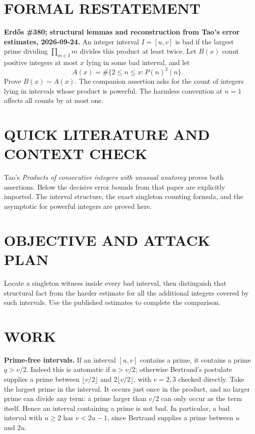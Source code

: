 \section{FORMAL RESTATEMENT}
\textbf{Erd\H{o}s \#380; structural lemmas and reconstruction from Tao's error estimates, 2026-09-24.}
An integer interval $I=[u,v]$ is bad if the largest prime dividing $\prod_{m\in I}m$ divides this product at least twice. Let $B(x)$ count positive integers at most $x$ lying in some bad interval, and let
\[
A(x)=\#\{2\leq n\leq x:P(n)^2\mid n\}.
\]
Prove $B(x)\sim A(x)$. The companion assertion asks for the count of integers lying in intervals whose product is powerful. The harmless convention at $n=1$ affects all counts by at most one.

\section{QUICK LITERATURE AND CONTEXT CHECK}
Tao's \emph{Products of consecutive integers with unusual anatomy} proves both assertions. Below the decisive error bounds from that paper are explicitly imported. The interval structure, the exact singleton counting formula, and the asymptotic for powerful integers are proved here.

\section{OBJECTIVE AND ATTACK PLAN}
Locate a singleton witness inside every bad interval, then distinguish that structural fact from the harder estimate for all the additional integers covered by such intervals. Use the published estimates to complete the comparison.

\section{WORK}
\textbf{Prime-free intervals.} If an interval $[u,v]$ contains a prime, it contains a prime $q>v/2$. Indeed this is automatic if $u>v/2$; otherwise Bertrand's postulate supplies a prime between $\lfloor v/2\rfloor$ and $2\lfloor v/2\rfloor$, with $v=2,3$ checked directly. Take the largest prime in the interval. It occurs just once in the product, and no larger prime can divide any term: a prime larger than $v/2$ can only occur as the term itself. Hence an interval containing a prime is not bad. In particular, a bad interval with $u\geq2$ has $v<2u-1$, since Bertrand supplies a prime between $u$ and $2u$.

